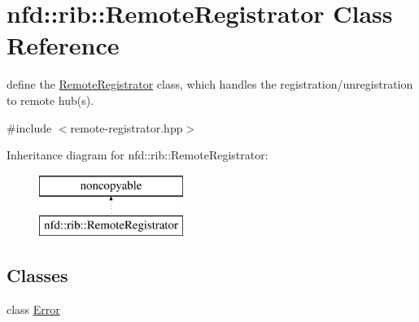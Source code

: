 \hypertarget{classnfd_1_1rib_1_1RemoteRegistrator}{}\section{nfd\+:\+:rib\+:\+:Remote\+Registrator Class Reference}
\label{classnfd_1_1rib_1_1RemoteRegistrator}


define the \hyperlink{classnfd_1_1rib_1_1RemoteRegistrator}{Remote\+Registrator} class, which handles the registration/unregistration to remote hub(s).  




{\ttfamily \#include $<$remote-\/registrator.\+hpp$>$}

Inheritance diagram for nfd\+:\+:rib\+:\+:Remote\+Registrator\+:\begin{figure}[H]
\begin{center}
\leavevmode
\includegraphics[height=2.000000cm]{classnfd_1_1rib_1_1RemoteRegistrator}
\end{center}
\end{figure}
\subsection*{Classes}
\begin{DoxyCompactItemize}
\item 
class \hyperlink{classnfd_1_1rib_1_1RemoteRegistrator_1_1Error}{Error}
\end{DoxyCompactItemize}

